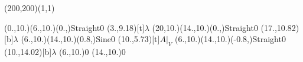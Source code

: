 \unitlength=1bp%

\begin{feynartspicture}(200,200)(1,1)

\FADiagram{}
\FAProp(0.,10.)(6.,10.)(0.,){Straight}{0}
\FALabel(3.,9.18)[t]{$\lambda$}
\FAProp(20,10.)(14.,10.)(0.,){Straight}{0}
\FALabel(17.,10.82)[b]{$\lambda$}
\FAProp(6.,10.)(14.,10.)(0.8,){Sine}{0}
\FALabel(10.,5.73)[t]{$A|_V$}
\FAProp(6.,10.)(14.,10.)(-0.8,){Straight}{0}
\FALabel(10.,14.02)[b]{$\lambda$}
\FAVert(6.,10.){0}
\FAVert(14.,10.){0}
\end{feynartspicture}

